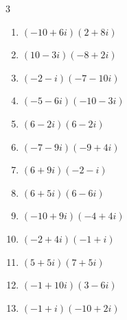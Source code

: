 \begin{multicols}{3}
\begin{enumerate}
  \item $\displaystyle (-10+6i)(2+8i)$

        \phantom{$\displaystyle =-68-68i$}

  \item $\displaystyle (10-3i)(-8+2i)$

        \phantom{$\displaystyle =-74+44i$}

  \item $\displaystyle (-2-i)(-7-10i)$

        \phantom{$\displaystyle =4+27i$}

  \item $\displaystyle (-5-6i)(-10-3i)$

        \phantom{$\displaystyle =32+75i$}

  \item $\displaystyle (6-2i)(6-2i)$

        \phantom{$\displaystyle =32-24i$}

  \item $\displaystyle (-7-9i)(-9+4i)$

        \phantom{$\displaystyle =99+53i$}

  \item $\displaystyle (6+9i)(-2-i)$

        \phantom{$\displaystyle =-3-24i$}

  \item $\displaystyle (6+5i)(6-6i)$

        \phantom{$\displaystyle =66-6i$}

\columnbreak %

  \item $\displaystyle (-10+9i)(-4+4i)$

        \phantom{$\displaystyle =4-76i$}

  \item $\displaystyle (-2+4i)(-1+i)$

        \phantom{$\displaystyle =-2-6i$}

  \item $\displaystyle (5+5i)(7+5i)$

        \phantom{$\displaystyle =10+60i$}

  \item $\displaystyle (-1+10i)(3-6i)$

        \phantom{$\displaystyle =57+36i$}

  \item $\displaystyle (-1+i)(-10+2i)$


\end{enumerate}
\end{multicols}
